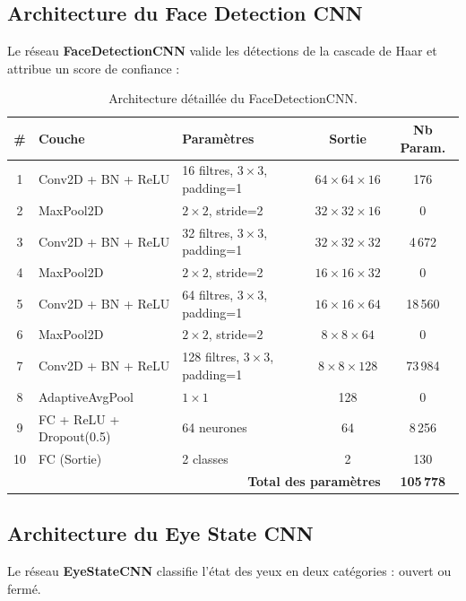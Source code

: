 \documentclass[12pt,a4paper,twoside]{report}
\newcommand{\keyword}[1]{\textbf{\textcolor{stellantisblue}{#1}}}
\begin{document}
\subsection{Architecture du Face Detection CNN}

Le réseau \keyword{FaceDetectionCNN} valide les détections de la cascade de Haar et attribue un score de confiance :

\begin{table}[H]
\centering
\caption{Architecture détaillée du FaceDetectionCNN.}
\label{tab:face_cnn}
\renewcommand{\arraystretch}{1.3}
\begin{tabularx}{\textwidth}{|c|l|l|c|c|}
\hline
\rowcolor{stellantisblue!15}
\textbf{\#} & \textbf{Couche} & \textbf{Paramètres} & \textbf{Sortie} & \textbf{Nb Param.} \\
\hline
1 & Conv2D + BN + ReLU & 16 filtres, $3 \times 3$, padding=1 & $64 \times 64 \times 16$ & 176 \\
\hline
2 & MaxPool2D & $2 \times 2$, stride=2 & $32 \times 32 \times 16$ & 0 \\
\hline
3 & Conv2D + BN + ReLU & 32 filtres, $3 \times 3$, padding=1 & $32 \times 32 \times 32$ & 4\,672 \\
\hline
4 & MaxPool2D & $2 \times 2$, stride=2 & $16 \times 16 \times 32$ & 0 \\
\hline
5 & Conv2D + BN + ReLU & 64 filtres, $3 \times 3$, padding=1 & $16 \times 16 \times 64$ & 18\,560 \\
\hline
6 & MaxPool2D & $2 \times 2$, stride=2 & $8 \times 8 \times 64$ & 0 \\
\hline
7 & Conv2D + BN + ReLU & 128 filtres, $3 \times 3$, padding=1 & $8 \times 8 \times 128$ & 73\,984 \\
\hline
8 & AdaptiveAvgPool & $1 \times 1$ & 128 & 0 \\
\hline
9 & FC + ReLU + Dropout(0.5) & 64 neurones & 64 & 8\,256 \\
\hline
10 & FC (Sortie) & 2 classes & 2 & 130 \\
\hline
\multicolumn{4}{|r|}{\textbf{Total des paramètres}} & \textbf{105\,778} \\
\hline
\end{tabularx}
\end{table}

\subsection{Architecture du Eye State CNN}

Le réseau \keyword{EyeStateCNN} classifie l'état des yeux en deux catégories : ouvert ou fermé.
\end{document}
